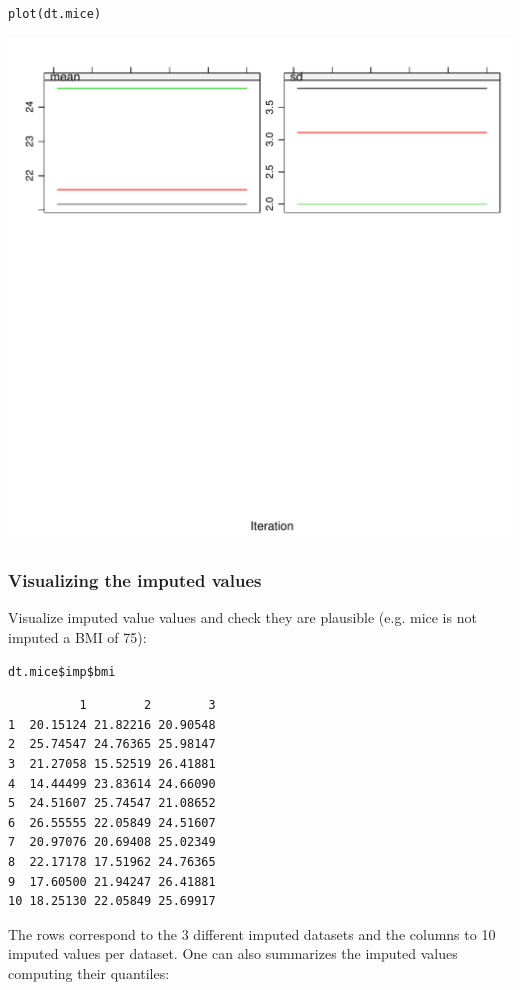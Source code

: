 \documentclass[12pt]{article}
\begin{document}
\lstset{language=r,label= ,caption= ,captionpos=b,numbers=none}
\begin{lstlisting}
plot(dt.mice)
\end{lstlisting}

\begin{center}
\includegraphics[width=.9\linewidth]{./traceCVimputed.pdf}
\end{center}

\subsubsection{Visualizing the imputed values}
\label{sec:org6fb4a51}
Visualize imputed value values and check they are plausible (e.g. mice
is not imputed a BMI of 75):
\lstset{language=r,label= ,caption= ,captionpos=b,numbers=none}
\begin{lstlisting}
dt.mice$imp$bmi
\end{lstlisting}

\begin{verbatim}
          1        2        3
1  20.15124 21.82216 20.90548
2  25.74547 24.76365 25.98147
3  21.27058 15.52519 26.41881
4  14.44499 23.83614 24.66090
5  24.51607 25.74547 21.08652
6  26.55555 22.05849 24.51607
7  20.97076 20.69408 25.02349
8  22.17178 17.51962 24.76365
9  17.60500 21.94247 26.41881
10 18.25130 22.05849 25.69917
\end{verbatim}

The rows correspond to the 3 different imputed datasets and the
columns to 10 imputed values per dataset. One can also summarizes the
imputed values computing their quantiles:
\end{document}
